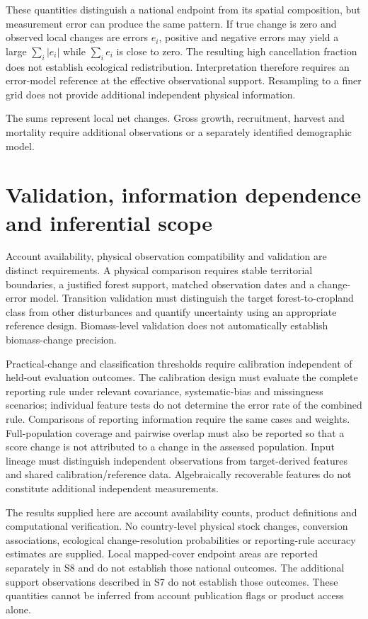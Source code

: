 \documentclass[11pt,a4paper]{article}
\begin{document}
These quantities distinguish a national endpoint from its spatial composition, but measurement error can produce the same pattern. If true change is zero and observed local changes are errors $e_i$, positive and negative errors may yield a large $\sum_i|e_i|$ while $\sum_i e_i$ is close to zero. The resulting high cancellation fraction does not establish ecological redistribution. Interpretation therefore requires an error-model reference at the effective observational support. Resampling to a finer grid does not provide additional independent physical information.

The sums represent local net changes. Gross growth, recruitment, harvest and mortality require additional observations or a separately identified demographic model.

\section{Validation, information dependence and inferential scope}

Account availability, physical observation compatibility and validation are distinct requirements. A physical comparison requires stable territorial boundaries, a justified forest support, matched observation dates and a change-error model. Transition validation must distinguish the target forest-to-cropland class from other disturbances and quantify uncertainty using an appropriate reference design. Biomass-level validation does not automatically establish biomass-change precision.

Practical-change and classification thresholds require calibration independent of held-out evaluation outcomes. The calibration design must evaluate the complete reporting rule under relevant covariance, systematic-bias and missingness scenarios; individual feature tests do not determine the error rate of the combined rule. Comparisons of reporting information require the same cases and weights. Full-population coverage and pairwise overlap must also be reported so that a score change is not attributed to a change in the assessed population. Input lineage must distinguish independent observations from target-derived features and shared calibration/reference data. Algebraically recoverable features do not constitute additional independent measurements.

The results supplied here are account availability counts, product definitions and computational verification. No country-level physical stock changes, conversion associations, ecological change-resolution probabilities or reporting-rule accuracy estimates are supplied. Local mapped-cover endpoint areas are reported separately in S8 and do not establish those national outcomes. The additional support observations described in S7 do not establish those outcomes. These quantities cannot be inferred from account publication flags or product access alone.
\end{document}
